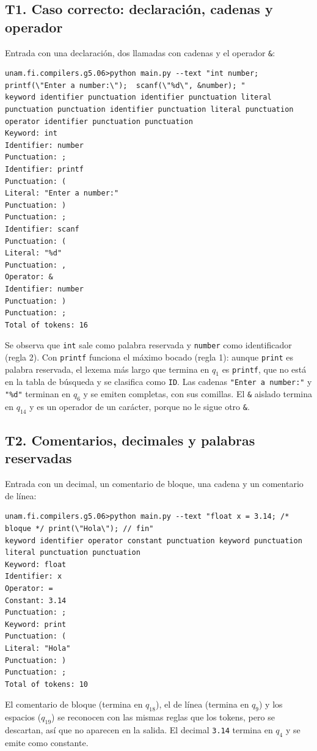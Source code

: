 \documentclass[12pt,letterpaper]{article}
\newcommand{\cd}[1]{\texttt{#1}}                       %
\begin{document}
\subsection{T1. Caso correcto: declaración, cadenas y operador}

Entrada con una declaración, dos llamadas con cadenas y el operador \cd{\&}:

\begin{lstlisting}
unam.fi.compilers.g5.06>python main.py --text "int number; printf(\"Enter a number:\");  scanf(\"%d\", &number); "
keyword identifier punctuation identifier punctuation literal punctuation punctuation identifier punctuation literal punctuation operator identifier punctuation punctuation
Keyword: int
Identifier: number
Punctuation: ;
Identifier: printf
Punctuation: (
Literal: "Enter a number:"
Punctuation: )
Punctuation: ;
Identifier: scanf
Punctuation: (
Literal: "%d"
Punctuation: ,
Operator: &
Identifier: number
Punctuation: )
Punctuation: ;
Total of tokens: 16
\end{lstlisting}

Se observa que \cd{int} sale como palabra reservada y \cd{number} como identificador (regla 2). Con \cd{printf} funciona el máximo bocado (regla 1): aunque \cd{print} es palabra reservada, el lexema más largo que termina en $q_1$ es \cd{printf}, que no está en la tabla de búsqueda y se clasifica como \cd{ID}. Las cadenas \cd{"Enter a number:"} y \cd{"\%d"} terminan en $q_6$ y se emiten completas, con sus comillas. El \cd{\&} aislado termina en $q_{14}$ y es un operador de un carácter, porque no le sigue otro \cd{\&}.

\subsection{T2. Comentarios, decimales y palabras reservadas}

Entrada con un decimal, un comentario de bloque, una cadena y un comentario de línea:

\begin{lstlisting}
unam.fi.compilers.g5.06>python main.py --text "float x = 3.14; /* bloque */ print(\"Hola\"); // fin"
keyword identifier operator constant punctuation keyword punctuation literal punctuation punctuation
Keyword: float
Identifier: x
Operator: =
Constant: 3.14
Punctuation: ;
Keyword: print
Punctuation: (
Literal: "Hola"
Punctuation: )
Punctuation: ;
Total of tokens: 10
\end{lstlisting}

El comentario de bloque (termina en $q_{18}$), el de línea (termina en $q_9$) y los espacios ($q_{19}$) se reconocen con las mismas reglas que los tokens, pero se descartan, así que no aparecen en la salida. El decimal \cd{3.14} termina en $q_4$ y se emite como constante.
\end{document}
